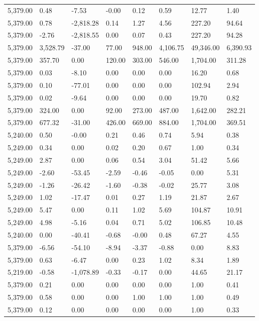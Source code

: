 \begin{longtable}{llllllll}
5,379.00 & 0.48 & -7.53 & -0.00 & 0.12 & 0.59 & 12.77 & 1.40 \\
5,379.00 & 0.78 & -2,818.28 & 0.14 & 1.27 & 4.56 & 227.20 & 94.64 \\
5,379.00 & -2.76 & -2,818.55 & 0.00 & 0.07 & 0.43 & 227.20 & 94.28 \\
5,379.00 & 3,528.79 & -37.00 & 77.00 & 948.00 & 4,106.75 & 49,346.00 & 6,390.93 \\
5,379.00 & 357.70 & 0.00 & 120.00 & 303.00 & 546.00 & 1,704.00 & 311.28 \\
5,379.00 & 0.03 & -8.10 & 0.00 & 0.00 & 0.00 & 16.20 & 0.68 \\
5,379.00 & 0.10 & -77.01 & 0.00 & 0.00 & 0.00 & 102.94 & 2.94 \\
5,379.00 & 0.02 & -9.64 & 0.00 & 0.00 & 0.00 & 19.70 & 0.82 \\
5,379.00 & 324.00 & 0.00 & 92.00 & 273.00 & 487.00 & 1,642.00 & 282.21 \\
5,379.00 & 677.32 & -31.00 & 426.00 & 669.00 & 884.00 & 1,704.00 & 369.51 \\
5,240.00 & 0.50 & -0.00 & 0.21 & 0.46 & 0.74 & 5.94 & 0.38 \\
5,249.00 & 0.34 & 0.00 & 0.02 & 0.20 & 0.67 & 1.00 & 0.34 \\
5,249.00 & 2.87 & 0.00 & 0.06 & 0.54 & 3.04 & 51.42 & 5.66 \\
5,249.00 & -2.60 & -53.45 & -2.59 & -0.46 & -0.05 & 0.00 & 5.31 \\
5,249.00 & -1.26 & -26.42 & -1.60 & -0.38 & -0.02 & 25.77 & 3.08 \\
5,249.00 & 1.02 & -17.47 & 0.01 & 0.27 & 1.19 & 21.87 & 2.67 \\
5,249.00 & 5.47 & 0.00 & 0.11 & 1.02 & 5.69 & 104.87 & 10.91 \\
5,249.00 & 4.98 & -5.16 & 0.04 & 0.71 & 5.02 & 106.85 & 10.48 \\
5,240.00 & 0.00 & -40.41 & -0.68 & -0.00 & 0.48 & 67.27 & 4.55 \\
5,379.00 & -6.56 & -54.10 & -8.94 & -3.37 & -0.88 & 0.00 & 8.83 \\
5,379.00 & 0.63 & -6.47 & 0.00 & 0.23 & 1.02 & 8.34 & 1.89 \\
5,219.00 & -0.58 & -1,078.89 & -0.33 & -0.17 & 0.00 & 44.65 & 21.17 \\
5,379.00 & 0.21 & 0.00 & 0.00 & 0.00 & 0.00 & 1.00 & 0.41 \\
5,379.00 & 0.58 & 0.00 & 0.00 & 1.00 & 1.00 & 1.00 & 0.49 \\
5,379.00 & 0.12 & 0.00 & 0.00 & 0.00 & 0.00 & 1.00 & 0.33 \\

\end{longtable}
